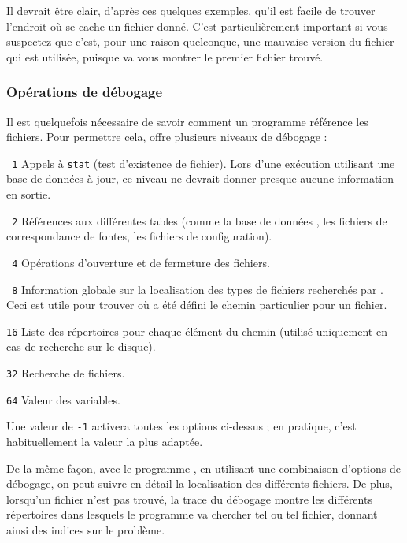 \documentclass[german, english, french]{article}
\begin{document}
Il devrait être clair, d'après ces quelques exemples, qu'il est facile de
trouver l'endroit où se cache un fichier donné. C'est particulièrement important
si vous suspectez que c'est, pour une raison quelconque, une mauvaise version du
fichier qui est utilisée, puisque  va vous montrer le premier
fichier trouvé.

\subsubsection{Opérations de débogage}
\label{sec:debugging}

Il est quelquefois nécessaire de savoir comment un programme référence les
fichiers. Pour permettre cela, \KPS{} offre plusieurs niveaux de débogage :
\begin{ttdescription}
\item[\texttt{\ 1}] Appels à \texttt{stat} (test d'existence de fichier). Lors
  d'une exécution utilisant une base de données  à jour, ce niveau ne
  devrait donner presque aucune information en sortie.
\item[\texttt{\ 2}] Références aux différentes tables (comme la base de données
  , les fichiers de correspondance de fontes, les fichiers de
  configuration).
\item[\texttt{\ 4}] Opérations d'ouverture et de fermeture des fichiers.
\item[\texttt{\ 8}] Information globale sur la localisation des types de
  fichiers recherchés par \KPS. Ceci est utile pour trouver où a été défini le
  chemin particulier pour un fichier.
\item[\texttt{16}] Liste des répertoires pour chaque élément du chemin (utilisé
  uniquement en cas de recherche sur le disque).
\item[\texttt{32}] Recherche de fichiers.
\item[\texttt{64}] Valeur des variables.
\end{ttdescription}
Une valeur de \texttt{-1} activera toutes les options ci-dessus ; en pratique,
c'est habituellement la valeur la plus adaptée.

De la même façon, avec le programme , en utilisant une
combinaison d'options de débogage, on peut suivre en détail la localisation des
différents fichiers. De plus, lorsqu'un fichier n'est pas trouvé, la trace du
débogage montre les différents répertoires dans lesquels le programme va
chercher tel ou tel fichier, donnant ainsi des indices sur le problème.
\end{document}
